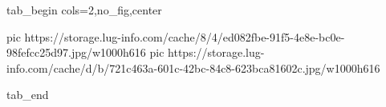  
 
 
 
 


\ifcmt
  tab_begin cols=2,no_fig,center

     pic https://storage.lug-info.com/cache/8/4/ed082fbe-91f5-4e8e-bc0e-98fefcc25d97.jpg/w1000h616%
		 pic https://storage.lug-info.com/cache/d/b/721c463a-601c-42bc-84c8-623bca81602c.jpg/w1000h616%

  tab_end
\fi
